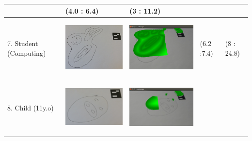 \documentclass[11pt]{article}
\begin{document}
\begin{landscape}
\begin{longtable}{p{}| p{}| p{} | p{} |p{}}
							& (4.0 : 6.4)
							& (3 : 11.2)\\
\hline
7. Student (Computing) & \begin{center}\includegraphics[scale=0.5]{pics/usertesting/7.png}\end{center} 
							& \begin{center}\includegraphics[scale=0.5]{pics/usertesting/7render.png}\end{center} 
							& (6.2 :7.4)
							& (8 : 24.8)\\
\hline	
8. Child (11y.o) & \begin{center}\includegraphics[scale=0.5]{pics/usertesting/8.png}\end{center} 
							& \begin{center}\includegraphics[scale=0.5]{pics/usertesting/8render.png}\end{center} 

\end{longtable}
\end{landscape}
\end{document}
